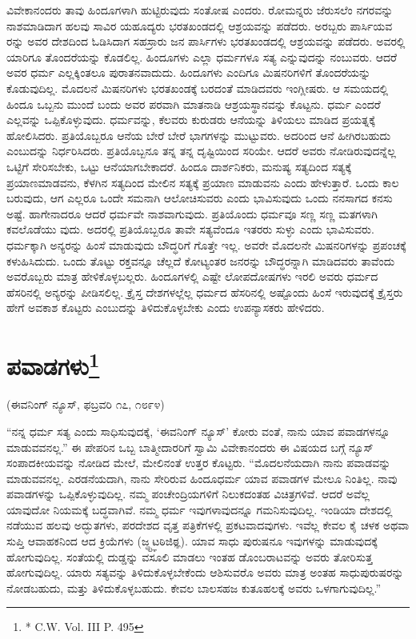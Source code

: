 ವಿವೇಕಾನಂದರು ತಾವು ಹಿಂದೂಗಳಾಗಿ ಹುಟ್ಟಿರುವುದು ಸಂತೋಷ ಎಂದರು. ರೋಮನ್ನರು ಜೆರುಸಲೆಂ ನಗರವನ್ನು ನಾಶಮಾಡಿದಾಗ ಹಲವು ಸಾವಿರ ಯಹೂದ್ಯರು ಭರತಖಂಡದಲ್ಲಿ ಆಶ್ರಯವನ್ನು ಪಡೆದರು. ಅರಬ್ಬರು ಪಾರ್ಸಿಯವ ರನ್ನು ಅವರ ದೇಶದಿಂದ ಓಡಿಸಿದಾಗ ಸಹಸ್ರಾರು ಜನ ಪಾರ್ಸಿಗಳು ಭರತಖಂಡದಲ್ಲಿ ಆಶ್ರಯವನ್ನು ಪಡೆದರು. ಅವರಲ್ಲಿ ಯಾರಿಗೂ ತೊಂದರೆಯನ್ನು ಕೊಡಲಿಲ್ಲ. ಹಿಂದೂಗಳು ಎಲ್ಲಾ ಧರ್ಮಗಳೂ ಸತ್ಯ ಎನ್ನುವುದನ್ನು ನಂಬುವರು. ಆದರೆ ಅವರ ಧರ್ಮ ಎಲ್ಲಕ್ಕಿಂತಲೂ ಪುರಾತನವಾದುದು. ಹಿಂದೂಗಳು ಎಂದಿಗೂ ಮಿಷನರಿಗಳಿಗೆ ತೊಂದರೆಯನ್ನು ಕೊಡುವುದಿಲ್ಲ. ಮೊದಲನೆ ಮಿಷನರಿಗಳು ಭರತಖಂಡಕ್ಕೆ ಬರದಂತೆ ಮಾಡಿದವರು ಇಂಗ್ಲೀಷರು. ಆ ಸಮಯದಲ್ಲಿ ಹಿಂದೂ ಒಬ್ಬನು ಮುಂದೆ ಬಂದು ಅವರ ಪರವಾಗಿ ಮಾತನಾಡಿ ಆಶ್ರಯಸ್ಥಾನವನ್ನು ಕೊಟ್ಟನು. ಧರ್ಮ ಎಂದರೆ ಎಲ್ಲವನ್ನು ಒಪ್ಪಿಕೊಳ್ಳುವುದು. ಧರ್ಮವನ್ನು, ಕೆಲವರು ಕುರುಡರು ಆನೆಯನ್ನು ತಿಳಿಯಲು ಮಾಡಿದ ಪ್ರಯತ್ನಕ್ಕೆ ಹೋಲಿಸಿದರು. ಪ್ರತಿಯೊಬ್ಬರೂ ಆನೆಯ ಬೇರೆ ಬೇರೆ ಭಾಗಗಳನ್ನು ಮುಟ್ಟುವರು. ಅದರಿಂದ ಆನೆ ಹೀಗಿರಬಹುದು ಎಂಬುದನ್ನು ನಿರ್ಧರಿಸಿದರು. ಪ್ರತಿಯೊಬ್ಬನೂ ತನ್ನ ತನ್ನ ದೃಷ್ಟಿಯಿಂದ ಸರಿಯೇ. ಆದರೆ ಅವರು ನೋಡಿರುವುದನ್ನೆಲ್ಲ ಒಟ್ಟಿಗೆ ಸೇರಿಸಬೇಕು, ಒಟ್ಟು ಆನೆಯಾಗಬೇಕಾದರೆ. ಹಿಂದೂ ದಾರ್ಶನಿಕರು, ಮನುಷ್ಯ ಸತ್ಯದಿಂದ ಸತ್ಯಕ್ಕೆ ಪ್ರಯಾಣಮಾಡವನು, ಕೆಳಗಿನ ಸತ್ಯದಿಂದ ಮೇಲಿನ ಸತ್ಯಕ್ಕೆ ಪ್ರಯಾಣ ಮಾಡುವನು ಎಂದು ಹೇಳುತ್ತಾರೆ. ಒಂದು ಕಾಲ ಬರುವುದು, ಆಗ ಎಲ್ಲರೂ ಒಂದೇ ಸಮನಾಗಿ ಆಲೋಚಿಸುವರು ಎಂದು ಭಾವಿಸುವುದು ಒಂದು ನನಸಾಗದ ಕನಸು ಅಷ್ಟೆ. ಹಾಗೇನಾದರೂ ಆದರೆ ಧರ್ಮವೇ ನಾಶವಾಗುವುದು. ಪ್ರತಿಯೊಂದು ಧರ್ಮವೂ ಸಣ್ಣ ಸಣ್ಣ ಮತಗಳಾಗಿ ಕವಲೊಡೆಯು ವುದು. ಅದರಲ್ಲಿ ಪ್ರತಿಯೊಬ್ಬರೂ ತಾವೇ ಸತ್ಯವೆಂದೂ ಇತರರು ಸುಳ್ಳು ಎಂದು ಭಾವಿಸುವರು. ಧರ್ಮಕ್ಕಾಗಿ ಅನ್ಯರನ್ನು ಹಿಂಸೆ ಮಾಡುವುದು ಬೌದ್ಧರಿಗೆ ಗೊತ್ತೇ ಇಲ್ಲ. ಅವರೇ ಮೊದಲನೇ ಮಿಷನರಿಗಳನ್ನು ಪ್ರಪಂಚಕ್ಕೆ ಕಳುಹಿಸಿದುದು. ಒಂದು ತೊಟ್ಟು ರಕ್ತವನ್ನೂ ಚೆಲ್ಲದೆ ಕೋಟ್ಯಂತರ ಜನರನ್ನು ಬೌದ್ಧರನ್ನಾಗಿ ಮಾಡಿದವರು ತಾವೆಂದು ಅವರೊಬ್ಬರು ಮಾತ್ರ ಹೇಳಿಕೊಳ್ಳಬಲ್ಲರು. ಹಿಂದೂಗಳಲ್ಲಿ ಎಷ್ಟೇ ಲೋಪದೋಷಗಳು ಇರಲಿ ಅವರು ಧರ್ಮದ ಹೆಸರಿನಲ್ಲಿ ಅನ್ಯರನ್ನು ಪೀಡಿಸಲಿಲ್ಲ. ಕ್ರೈಸ್ತ ದೇಶಗಳಲ್ಲೆಲ್ಲ ಧರ್ಮದ ಹೆಸರಿನಲ್ಲಿ ಅಷ್ಟೊಂದು ಹಿಂಸೆ ಇರುವುದಕ್ಕೆ ಕ್ರೈಸ್ತರು ಹೇಗೆ ಅವಕಾಶ ಕೊಟ್ಟರು ಎಂಬುದನ್ನು ತಿಳಿದುಕೊಳ್ಳಬೇಕು ಎಂದು ಉಪನ್ಯಾಸಕರು ಹೇಳಿದರು.

\delimiter


\section{ಪವಾಡಗಳು\protect\footnote{* C.W. Vol. III P. 495}}

\begin{center}
(ಈವನಿಂಗ್​ ನ್ಯೂಸ್​, ಫಬ್ರವರಿ ೧೭, ೧೮೯೪)
\end{center}

“ನನ್ನ ಧರ್ಮ ಸತ್ಯ ಎಂದು ಸಾಧಿಸುವುದಕ್ಕೆ, ‘ಈವನಿಂಗ್​ ನ್ಯೂಸ್​’ ಕೋರು ವಂತೆ, ನಾನು ಯಾವ ಪವಾಡಗಳನ್ನೂ ಮಾಡುವವನಲ್ಲ.” ಈ ಪೇಪರಿನ ಒಬ್ಬ ಬಾತ್ಮೀದಾರರಿಗೆ ಸ್ವಾಮಿ ವಿವೇಕಾನಂದರು ಈ ವಿಷಯದ ಬಗ್ಗೆ ನ್ಯೂಸ್​ ಸಂಪಾದಕೀಯವನ್ನು ನೋಡಿದ ಮೇಲೆ, ಮೇಲಿನಂತೆ ಉತ್ತರ ಕೊಟ್ಟರು. “ಮೊದಲನೆಯದಾಗಿ ನಾನು ಪವಾಡವನ್ನು ಮಾಡುವವನಲ್ಲ. ಎರಡನೆಯದಾಗಿ, ನಾನು ಸೇರಿರುವ ಹಿಂದೂಧರ್ಮ ಯಾವ ಪವಾಡಗಳ ಮೇಲೂ ನಿಂತಿಲ್ಲ. ನಾವು ಪವಾಡಗಳನ್ನು ಒಪ್ಪಿಕೊಳ್ಳುವುದಿಲ್ಲ. ನಮ್ಮ ಪಂಚೇಂದ್ರಿಯಗಳಿಗೆ ನಿಲುಕದಂತಹ ವಿಚಿತ್ರಗಳಿವೆ. ಆದರೆ ಅವೆಲ್ಲ ಯಾವುದೋ ನಿಯಮಕ್ಕೆ ಬದ್ಧವಾಗಿವೆ. ನಮ್ಮ ಧರ್ಮ ಇವುಗಳಾವುದನ್ನೂ ಗಮನಿಸುವುದಿಲ್ಲ. ಇಂಡಿಯಾ ದೇಶದಲ್ಲಿ ನಡೆಯುವ ಹಲವು ಅದ್ಭುತಗಳು, ಪರದೇಶದ ವೃತ್ತ ಪತ್ರಿಕೆಗಳಲ್ಲಿ ಪ್ರಕಟವಾದವುಗಳು. ಇವೆಲ್ಲ ಕೇವಲ ಕೈ ಚಳಕ ಅಥವಾ ಸುಪ್ತಿ ಆವಾಹಕನಿಂದ ಆದ ಕ್ರಿಯೆಗಳು (ಜ್ಢ್ಟ್ಞಟಠಿಜಿಠ್ಞ). ಯಾವ ಸಾಧು ಪುರುಷನೂ ಇವುಗಳನ್ನು ಮಾಡುವುದಕ್ಕೆ ಹೋಗುವುದಿಲ್ಲ. ಸಂತೆಯಲ್ಲಿ ದುಡ್ಡನ್ನು ವಸೂಲಿ ಮಾಡಲು ಇಂತಹ ಡೊಂಬರಾಟವನ್ನು ಅವರು ತೋರಿಸುತ್ತ ಹೋಗುವುದಿಲ್ಲ. ಯಾರು ಸತ್ಯವನ್ನು ತಿಳಿದುಕೊಳ್ಳಬೇಕೆಂದು ಆಶಿಸುವರೊ ಅವರು ಮಾತ್ರ ಅಂತಹ ಸಾಧುಪುರುಷರನ್ನು ನೋಡಬಹುದು, ಮತ್ತು ತಿಳಿದುಕೊಳ್ಳಬಹುದು. ಕೇವಲ ಬಾಲಸಹಜ ಕುತೂಹಲಕ್ಕೆ ಅವರು ಒಳಗಾಗುವುದಿಲ್ಲ.”

